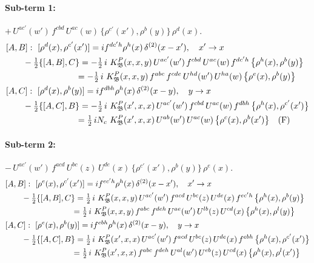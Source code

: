 \documentclass[10pt]{article}
\numberwithin{equation}{section}
\begin{document}
\paragraph{Sub-term 1:} $+\,U^{ac'}(w')\,f^{cbd}\,U^{ac}(w)\,\big\{\rho^{c'}(x'),\rho^{b}(y)\big\}\,\rho^{d}(x)$.
\begin{align}
&[A,B]:\ [\rho^{d}(x),\rho^{c'}(x')]=i f^{dc'h}\rho^{h}(x)\,\delta^{(2)}(x-x'),\quad x'\to x\notag\\
&\qquad -\tfrac12\{[A,B],C\}=-\tfrac12\,i\,\,K^{P}_{\mathfrak B}(x,x,y)\,U^{ac'}(w')\,f^{cbd}\,U^{ac}(w)\,f^{dc'h}\,\big\{\rho^{h}(x),\rho^{b}(y)\big\}\notag\\
&\qquad\phantom{-\tfrac12\{[A,B],C\}}=-\tfrac12\,i\,\,K^{P}_{\mathfrak B}(x,x,y)\,f^{abc}\,f^{cde}\,U^{hd}(w')\,U^{ha}(w)\,\big\{\rho^{e}(x),\rho^{b}(y)\big\}
\label{B:eq:GII.I1.P-1-AB}\\
&[A,C]:\ [\rho^{d}(x),\rho^{b}(y)]=i f^{dbh}\rho^{h}(x)\,\delta^{(2)}(x-y),\quad y\to x\notag\\
&\qquad -\tfrac12\{[A,C],B\}=-\tfrac12\,i\,\,K^{P}_{\mathfrak B}(x',x,x)\,U^{ac'}(w')\,f^{cbd}\,U^{ac}(w)\,f^{dbh}\,\big\{\rho^{h}(x),\rho^{c'}(x')\big\}\notag\\
&\qquad\phantom{-\tfrac12\{[A,C],B\}}=\tfrac12\,i N_{c}\,\,K^{P}_{\mathfrak B}(x',x,x)\,U^{ab}(w')\,U^{ac}(w)\,\big\{\rho^{c}(x),\rho^{b}(x')\big\}\quad\text{(F)}
\label{B:eq:GII.I1.P-1-AC}
\end{align}
\paragraph{Sub-term 2:} $-\,U^{ac'}(w')\,f^{acd}\,U^{bc}(z)\,U^{de}(x)\,\big\{\rho^{c'}(x'),\rho^{b}(y)\big\}\,\rho^{e}(x)$.
\begin{align}
&[A,B]:\ [\rho^{e}(x),\rho^{c'}(x')]=i f^{ec'h}\rho^{h}(x)\,\delta^{(2)}(x-x'),\quad x'\to x\notag\\
&\qquad -\tfrac12\{[A,B],C\}=\tfrac12\,i\,\,K^{P}_{\mathfrak B}(x,x,y)\,U^{ac'}(w')\,f^{acd}\,U^{bc}(z)\,U^{de}(x)\,f^{ec'h}\,\big\{\rho^{h}(x),\rho^{b}(y)\big\}\notag\\
&\qquad\phantom{-\tfrac12\{[A,B],C\}}=\tfrac12\,i\,\,K^{P}_{\mathfrak B}(x,x,y)\,f^{abc}\,f^{deh}\,U^{ae}(w')\,U^{lb}(z)\,U^{cd}(x)\,\big\{\rho^{h}(x),\rho^{l}(y)\big\}
\label{B:eq:GII.I1.P-2-AB}\\
&[A,C]:\ [\rho^{e}(x),\rho^{b}(y)]=i f^{ebh}\rho^{h}(x)\,\delta^{(2)}(x-y),\quad y\to x\notag\\
&\qquad -\tfrac12\{[A,C],B\}=\tfrac12\,i\,\,K^{P}_{\mathfrak B}(x',x,x)\,U^{ac'}(w')\,f^{acd}\,U^{bc}(z)\,U^{de}(x)\,f^{ebh}\,\big\{\rho^{h}(x),\rho^{c'}(x')\big\}\notag\\
&\qquad\phantom{-\tfrac12\{[A,C],B\}}=\tfrac12\,i\,\,K^{P}_{\mathfrak B}(x',x,x)\,f^{abc}\,f^{deh}\,U^{al}(w')\,U^{eb}(z)\,U^{cd}(x)\,\big\{\rho^{h}(x),\rho^{l}(x')\big\}
\label{B:eq:GII.I1.P-2-AC}
\end{align}
\end{document}
